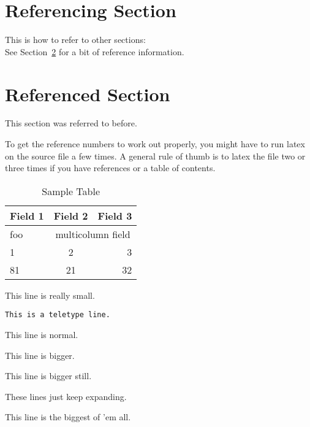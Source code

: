 \section{Referencing Section}
This is how to refer to other sections:\\
See Section~\ref{myref} for a bit of reference information.

\section{Referenced Section}
\label{myref}
This section was referred to before.

To get the reference numbers to work out properly, you might have
to run latex on the source file a few times.  A general rule of
thumb is to latex the file two or three times if you have references
or a table of contents.



\begin{table}[h]
\caption{Sample Table}
\begin{center}
\begin{tabular}{|l|c|r|}
\hline
Field 1 & Field 2 & Field 3 \\
\hline
foo & \multicolumn{2}{|c|}{multicolumn field} \\
\hline
1 & 2 & 3 \\
\cline{1-2}
81 & 21 & 32 \\
\hline
\end{tabular}
\end{center}
\end{table}

% 
% 

{\tiny This line is really small.}

{\tt This is a teletype line.}

This line is normal.

{\large This line is bigger.}

{\Large This line is bigger still.}

{\huge These lines just keep expanding.}

{\Huge This line is the biggest of 'em all.}


